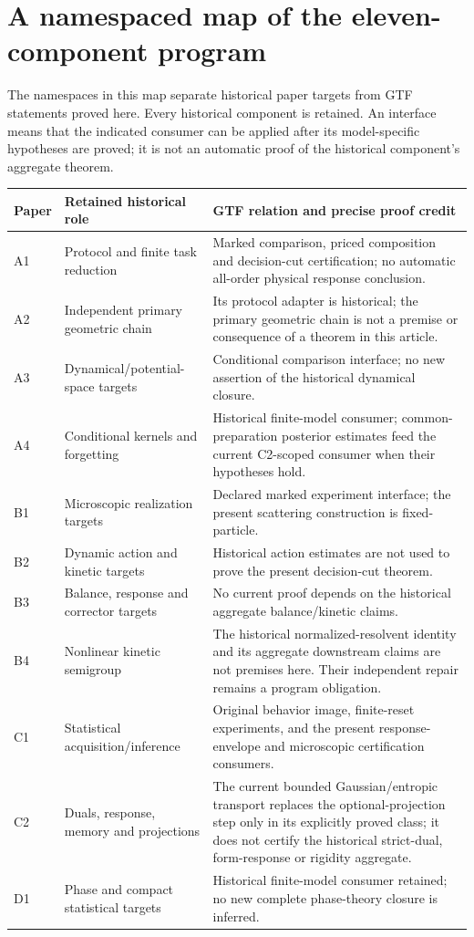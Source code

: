 \section{A namespaced map of the eleven-component program}
\label{sec:v20-program}
The namespaces in this map separate historical paper targets from GTF
statements proved here. Every historical component is retained. An
interface means that the indicated consumer can be applied after its
model-specific hypotheses are proved; it is not an automatic proof of
the historical component's aggregate theorem.
\begin{center}
\small
\begin{tabular}{p{}p{}p{}}
\toprule
Paper & Retained historical role & GTF relation and precise proof credit\\
\midrule
A1 & Protocol and finite task reduction & Marked comparison, priced
composition and decision-cut certification; no automatic all-order
physical response conclusion.\\[3pt]
A2 & Independent primary geometric chain & Its protocol adapter is
historical; the primary geometric chain is not a premise or consequence
of a theorem in this article.\\[3pt]
A3 & Dynamical/potential-space targets & Conditional comparison interface;
no new assertion of the historical dynamical closure.\\[3pt]
A4 & Conditional kernels and forgetting & Historical finite-model consumer;
common-preparation posterior estimates feed the current C2-scoped
consumer when their hypotheses hold.\\[3pt]
B1 & Microscopic realization targets & Declared marked experiment
interface; the present scattering construction is fixed-particle.\\[3pt]
B2 & Dynamic action and kinetic targets & Historical action estimates are
not used to prove the present decision-cut theorem.\\[3pt]
B3 & Balance, response and corrector targets & No current proof depends
on the historical aggregate balance/kinetic claims.\\[3pt]
B4 & Nonlinear kinetic semigroup & The historical normalized-resolvent
identity and its aggregate downstream claims are not premises here.
Their independent repair remains a program obligation.\\[3pt]
C1 & Statistical acquisition/inference & Original behavior image,
finite-reset experiments, and the present response-envelope and
microscopic certification consumers.\\[3pt]
C2 & Duals, response, memory and projections & The current bounded
Gaussian/entropic transport replaces the optional-projection step only
in its explicitly proved class; it does not certify the historical
strict-dual, form-response or rigidity aggregate.\\[3pt]
D1 & Phase and compact statistical targets & Historical finite-model
consumer retained; no new complete phase-theory closure is inferred.\\
\bottomrule
\end{tabular}
\end{center}
